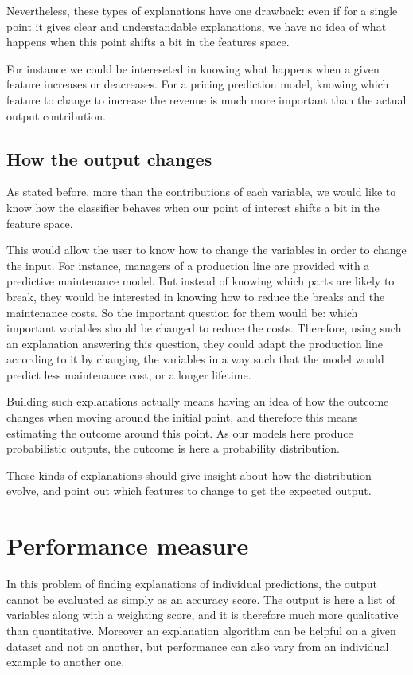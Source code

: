 \documentclass[a4paper,11pt]{kth-mag}
\begin{document}
Nevertheless, these types of explanations have one drawback: even if for a single point it gives clear and understandable explanations, we have no idea of what happens when this point shifts a bit in the features space.

For instance we could be intereseted in knowing what happens when a given feature increases or deacreases. For a pricing prediction model, knowing which feature to change to increase the revenue is much more important than the actual output contribution.

\subsection{How the output changes}

As stated before, more than the contributions of each variable, we would like to know how the classifier behaves when our point of interest shifts a bit in the feature space.

This would allow the user to know how to change the variables in order to change the input. For instance, managers of a production line are provided with a predictive maintenance model. But instead of knowing which parts are likely to break, they would be interested in knowing how to reduce the breaks and the maintenance costs. So the important question for them would be: which important variables should be changed to reduce the costs. Therefore, using such an explanation answering this question, they could adapt the production line  according to it by changing the variables in a way such that the model would predict less maintenance cost, or a longer lifetime.

Building such explanations actually means having an idea of how the outcome changes when moving around the initial point, and therefore this means estimating the outcome around this point. As our models here produce probabilistic outputs, the outcome is here a probability distribution.

These kinds of explanations should give insight about how the distribution evolve, and point out which features to change to get the expected output.


\section{Performance measure}

In this problem of finding explanations of individual predictions, the output cannot be evaluated as simply as an accuracy score. The output is here a list of variables along with a weighting score, and it is therefore much more qualitative than quantitative. Moreover an explanation algorithm can be helpful on a given dataset and not on another, but performance can also vary from an individual example to another one.
\end{document}
